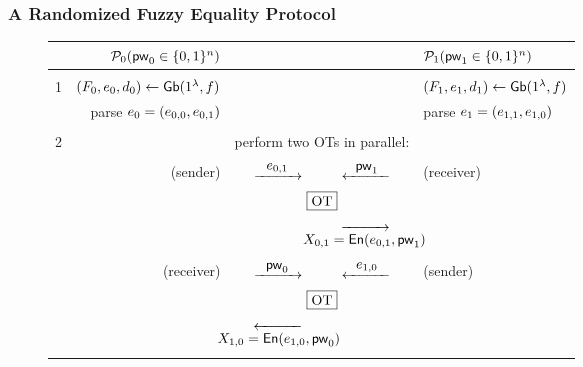 
\subsubsection{A Randomized Fuzzy Equality Protocol}
\label{sec:rfeprot}

\begin{figure}[tb]
  \centering
  \scriptsize
   \begin{fboxenv}
     \begin{tabular}{lrcl}
     & $\mathcal{P}_{0}(\mathsf{pw}_{0} \in \{0,1\}^{n})$ &   & $\mathcal{P}_{1}(\mathsf{pw}_{1} \in \{0,1\}^{n})$ \\ \hline \\
    1 & $(F_{0}, e_{0}, d_{0}) \gets \mathsf{Gb}(1^{\lambda}, f)$ & & $(F_{1}, e_{1}, d_{1}) \gets \mathsf{Gb}(1^{\lambda}, f)$\\
    & parse $e_{0} = (e_{0, 0}, e_{0, 1})$ & & parse $e_{1} = (e_{1, 1}, e_{1, 0})$ \\ \\
    2 & & perform two OTs in parallel: & \\ \\
    & (sender) & $\xrightarrow{\makebox[1cm]{$\eninp_{\firstindex, \secondindex}$}} \hspace{1cm} \xleftarrow{\makebox[1cm]{$\secondpw$}}$ & (receiver) \\ 
    & & $\fbox{OT}$ & \\
    & & $\hspace{2.2cm} \xrightarrow[{\makebox[1cm]{$\ginp_{\firstindex, \secondindex}=\en(\eninp_{\firstindex,\secondindex},\secondpw)$}}]{}$ &  \\ 
    &&& \\
    & (receiver) & $\xrightarrow{\makebox[1cm]{$\firstpw$}} \hspace{1cm} \xleftarrow{\makebox[1cm]{$\eninp_{\secondindex, \firstindex}$}}$ & (sender) \\ 
    & & $\fbox{OT}$ & \\
    & & $\xleftarrow[{\makebox[1cm]{$\ginp_{\secondindex, \firstindex}=\en(\eninp_{\secondindex,\firstindex},\firstpw)$}}]{} \hspace{2.2cm}$ &  \\ \\

\end{tabular}
\end{fboxenv}
\end{figure}
